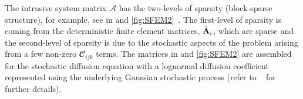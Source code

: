 \documentclass[letter,1p,11pt,oneside,onecolumn,sort&compress]{elsarticle}
\begin{document}



The intrusive system matrix $\mathcal{A}$ has the two-levels of sparsity (block-sparse structure), for example, see in  and \ref{fig:SFEM2}~\cite{ghanem1996numerical,ghanem1999stochastic,pellissetti2000iterative}. The first-level of sparsity is coming from the deterministic finite element matrices, ${\hat{{\mathrm{\bf{A}}}}_i}$, which are sparse and the second-level of sparsity is due to the stochastic aspects of the problem arising from a few non-zero $\mathbfcal{C}_{ijk}$ terms.
The matrices in  and \ref{fig:SFEM2} are assembled for the stochastic diffusion equation with a lognormal diffusion coefficient represented using the underlying Gaussian stochastic process (refer to ~\cite{desai2019scalable} for further details).
\end{document}
